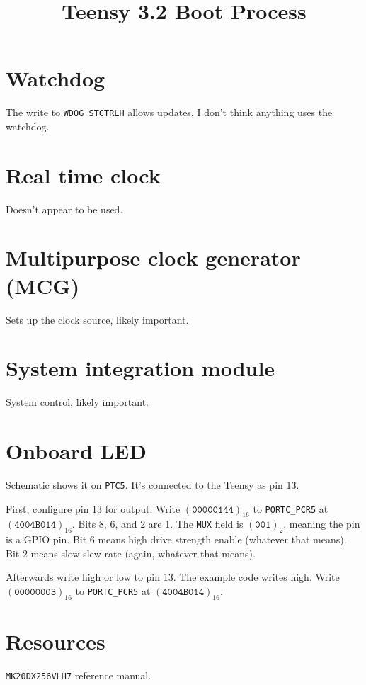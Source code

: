 \documentclass{article}
\title{Teensy 3.2 Boot Process}
\newcommand{\binary}[1]{$(\texttt{#1})_{2}$}
\newcommand{\hexadecimal}[1]{$(\texttt{#1})_{16}$}
\begin{document}
\maketitle

\section{Watchdog}

The write to \texttt{WDOG\_STCTRLH} allows updates.
I don't think anything uses the watchdog.

\section{Real time clock}

Doesn't appear to be used.

\section{Multipurpose clock generator (MCG)}

Sets up the clock source, likely important.

\section{System integration module}

System control, likely important.

\section{Onboard LED}

Schematic shows it on \texttt{PTC5}.
It's connected to the Teensy as pin 13.

First, configure pin 13 for output.
Write \hexadecimal{00000144} to \texttt{PORTC\_PCR5} at \hexadecimal{4004B014}.
Bits 8, 6, and 2 are 1.
The \texttt{MUX} field is \binary{001}, meaning the pin is a GPIO pin.
Bit 6 means high drive strength enable (whatever that means).
Bit 2 means slow slew rate (again, whatever that means).

Afterwards write high or low to pin 13.
The example code writes high.
Write \hexadecimal{00000003} to \texttt{PORTC\_PCR5} at \hexadecimal{4004B014}.

\section{Resources}

\texttt{MK20DX256VLH7} reference manual.
\end{document}
